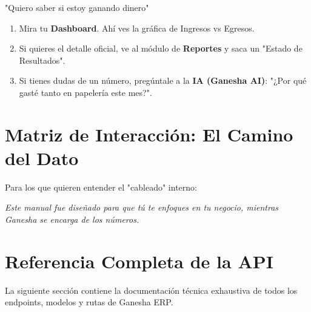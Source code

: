 \documentclass[12pt, a4paper, oneside]{book}
\begin{document}
\begin{escenario}{"Quiero saber si estoy ganando dinero"}
    \begin{enumerate}
        \item Mira tu \textbf{Dashboard}. Ahí ves la gráfica de Ingresos vs Egresos.
        \item Si quieres el detalle oficial, ve al módulo de \textbf{Reportes} y saca un "Estado de Resultados".
        \item Si tienes dudas de un número, pregúntale a la \textbf{IA (Ganesha AI)}: "¿Por qué gasté tanto en papelería este mes?".
    \end{enumerate}
\end{escenario}

\chapter{Matriz de Interacción: El Camino del Dato}

Para los que quieren entender el "cableado" interno:

\begin{center}
\end{center}

\vfill
\begin{center}
    \color{gray} \textit{Este manual fue diseñado para que tú te enfoques en tu negocio, mientras Ganesha se encarga de los números.}
\end{center}
\chapter{Referencia Completa de la API}
La siguiente sección contiene la documentación técnica exhaustiva de todos los endpoints, modelos y rutas de Ganesha ERP.
\end{document}
